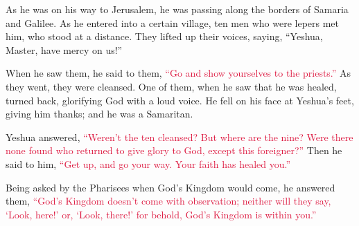 \myverse{}As he was on his way to Jerusalem, he was passing along the
borders of Samaria and Galilee.
\myverse{}As he entered into a certain village, ten men who were lepers met him, who
stood at a distance.
\myverse{}They lifted up their voices, saying, “Yeshua, Master, have mercy on us!”

\myverse{}When he saw them, he said to them,
\textcolor{crimson}{“Go and show yourselves to the priests.”} As they went, they were cleansed.
\myverse{}One of them, when he saw that he was healed, turned back, glorifying God
with a loud voice.
\myverse{}He fell on his face at Yeshua’s feet, giving him thanks; and he was a Samaritan.

\myverse{}Yeshua answered,
\textcolor{crimson}{“Weren’t the ten cleansed? But where are the nine?
}
\myverse{}\textcolor{crimson}{Were there none found who returned to give glory to God, except this
	foreigner?”}
\myverse{}Then he said to him,
\textcolor{crimson}{“Get up, and go your way. Your faith has healed you.”}

\myverse{}Being asked by the Pharisees when God’s Kingdom would come,
he answered them,
\textcolor{crimson}{“God’s Kingdom doesn’t come with observation;
}
\myverse{}\textcolor{crimson}{neither will they say, ‘Look, here!’ or, ‘Look, there!’ for behold, God’s
	Kingdom is within you.”}

